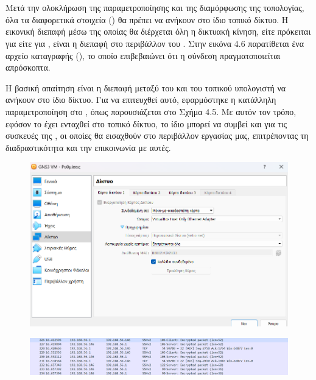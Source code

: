 \section{ }


Μετά την ολοκλήρωση της παραμετροποίησης και της διαμόρφωσης της τοπολογίας, όλα τα διαφορετικά στοιχεία () 
θα πρέπει να ανήκουν στο ίδιο τοπικό δίκτυο. Η εικονική διεπαφή μέσω της οποίας θα διέρχεται όλη η δικτυακή κίνηση, είτε πρόκειται για 
είτε για , είναι η διεπαφή  στο περιβάλλον του . Στην εικόνα 4.6 παρατίθεται ένα αρχείο καταγραφής (), 
το οποίο επιβεβαιώνει ότι η σύνδεση πραγματοποιείται απρόσκοπτα.

Η βασική απαίτηση είναι η διεπαφή μεταξύ του  και του τοπικού υπολογιστή να ανήκουν στο ίδιο δίκτυο. 
Για να επιτευχθεί αυτό, εφαρμόστηκε η κατάλληλη παραμετροποίηση στο , όπως παρουσιάζεται στο Σχήμα 4.5. 
Με αυτόν τον τρόπο, εφόσον το  έχει ενταχθεί στο τοπικό δίκτυο, το ίδιο μπορεί να συμβεί και για τις συσκευές της 
, οι οποίες θα εισαχθούν στο περιβάλλον εργασίας μας, επιτρέποντας τη διαδραστικότητα και την επικοινωνία με αυτές.

\begin{figure}[htb]
	\centering
	\includegraphics[width=1.0\textwidth]{graphics/network_config_GNS3.png}
	\caption{ }
\end{figure}


\begin{figure}[htb]
	\centering
	\includegraphics[width=1.0\textwidth]{graphics/ssh_connection.png}
	\caption{ }
\end{figure}


